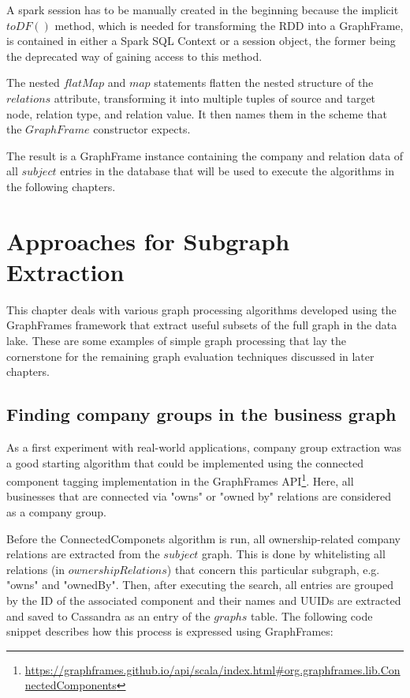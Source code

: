 \documentclass[
        a4paper,     %
        titlepage,   %
        oneside,     %
        parskip      %
]{scrartcl}          %
\begin{document}
    A spark session has to be manually created in the beginning because the implicit $toDF()$ method,
    which is needed for transforming the RDD into a GraphFrame, is contained in either a
    Spark SQL Context or a session object, the former being the deprecated way of gaining access to this method.

    The nested $flatMap$ and $map$ statements flatten the nested structure of the $relations$ attribute,
    transforming it into multiple tuples of source and target node, relation type, and relation value.
    It then names them in the scheme that the $GraphFrame$ constructor expects.

    The result is a GraphFrame instance containing the company and relation data of all $subject$
    entries in the database that will be used to execute the algorithms in the following chapters.
    \pagebreak

  \section{Approaches for Subgraph Extraction}
  This chapter deals with various graph processing algorithms developed using the
  GraphFrames framework that extract useful subsets of the full graph in the data lake.
  These are some examples of simple graph processing that lay the cornerstone
  for the remaining graph evaluation techniques discussed in later chapters.

  \subsection{Finding company groups in the business graph}
  As a first experiment with real-world applications, company group extraction
  was a good starting algorithm that could be implemented using the connected component
  tagging implementation in the GraphFrames
  API\footnote{\url{https://graphframes.github.io/api/scala/index.html\#org.graphframes.lib.ConnectedComponents}}.
  Here, all businesses that are connected via "owns" or "owned by"
  relations are considered as a company group.

  Before the ConnectedComponets algorithm is run, all ownership-related company
  relations are extracted from the $subject$ graph. This is done by whitelisting
  all relations (in $ownershipRelations$) that concern this particular subgraph,
  e.g. "owns" and "ownedBy".
  Then, after executing the search, all entries are grouped by the ID of the
  associated component and their names and UUIDs are extracted and saved to Cassandra
  as an entry of the $graphs$ table. The following code snippet describes how
  this process is expressed using GraphFrames:
\end{document}
